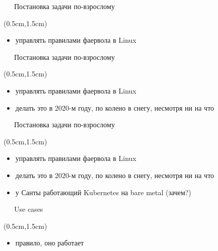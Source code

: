 \documentclass[xetex,18pt,aspectratio=43]{beamer}
\begin{document}
\begin{Large}

\begin{frame}{\ \ \ Постановка задачи по-взрослому}
\begin{textblock*}{\framewidth-0.8cm}(0.5cm,1.5cm)
\begin{itemize}
  \item {\color {red}{\bf Я хочу}} управлять правилами фаервола в Linux
\end{itemize}
\end{textblock*}
\end{frame}

\begin{frame}{\ \ \ Постановка задачи по-взрослому}
\begin{textblock*}{\framewidth-0.8cm}(0.5cm,1.5cm)
\begin{itemize}
  \item {\color {red}{\bf Я хочу}} управлять правилами фаервола в Linux
  \item {\color {red}{\bf Я хочу}} делать это в 2020-м году, по колено в снегу,
    несмотря ни на что
\end{itemize}
\end{textblock*}
\end{frame}

\begin{frame}{\ \ \ Постановка задачи по-взрослому}
\begin{textblock*}{\framewidth-0.8cm}(0.5cm,1.5cm)
\begin{itemize}
  \item {\color {red}{\bf Я хочу}} управлять правилами фаервола в Linux
  \item {\color {red}{\bf Я хочу}} делать это в 2020-м году, по колено в снегу,
    несмотря ни на что
  \item {\color {red}{\bf Я попросил}} у Санты работающий Kubernetes на bare
    metal (зачем?)
\end{itemize}
\end{textblock*}
\end{frame}

\begin{frame}{\ \ \ Use cases}
\begin{textblock*}{\framewidth-0.8cm}(0.5cm,1.5cm)
\begin{itemize}
  \item {\color {darkpastelgreen}{\bf Я добавляю}} правило, оно работает
\end{itemize}
\end{textblock*}
\end{frame}


\end{Large}
\end{document}
